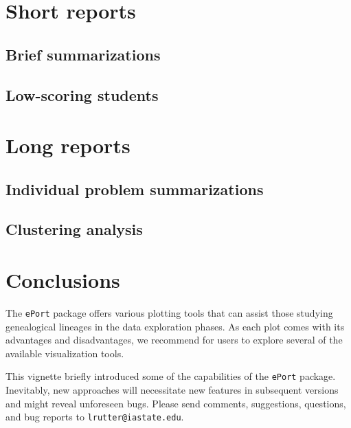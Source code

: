 \documentclass{article}
\numberwithin{equation}{section} %
\newcommand{\pkg}[1]{{\texttt{#1}}}
\begin{document}
\section{Short reports}

\subsection{Brief summarizations}
\subsection{Low-scoring students}

\section{Long reports}

\subsection{Individual problem summarizations}
\subsection{Clustering analysis}

\section{Conclusions}

The \pkg{ePort} package offers various plotting tools that can assist those studying genealogical lineages in the data exploration phases. As each plot comes with its advantages and disadvantages, we recommend for users to explore several of the available visualization tools.

This vignette briefly introduced some of the capabilities of the \pkg{ePort} package. Inevitably, new approaches will necessitate new features in subsequent versions and might reveal unforeseen bugs. Please send comments, suggestions, questions, and bug reports to \texttt{lrutter@iastate.edu}.
\end{document}
